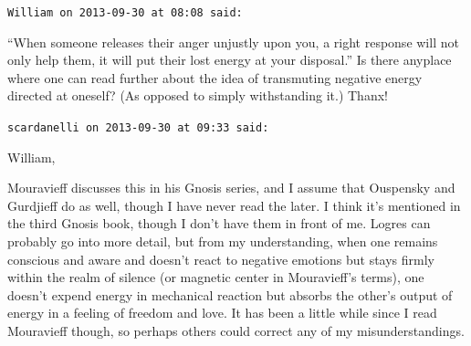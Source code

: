 \begin{footnotesize}
\begin{sffamily}
\texttt{William on 2013-09-30 at 08:08 said:}

``When someone releases their anger unjustly upon you, a right response will not only help them, it will put their lost energy at your disposal.'' Is there anyplace where one can read further about the idea of transmuting negative energy directed at oneself? (As opposed to simply withstanding it.) Thanx!

\hfill

\texttt{scardanelli on 2013-09-30 at 09:33 said:}

William,

Mouravieff discusses this in his Gnosis series, and I assume that Ouspensky and Gurdjieff do as well, though I have never read the later. I think it's mentioned in the third Gnosis book, though I don't have them in front of me. Logres can probably go into more detail, but from my understanding, when one remains conscious and aware and doesn't react to negative emotions but stays firmly within the realm of silence (or magnetic center in Mouravieff's terms), one doesn't expend energy in mechanical reaction but absorbs the other's output of energy in a feeling of freedom and love. It has been a little while since I read Mouravieff though, so perhaps others could correct any of my misunderstandings.


\hfill

\end{sffamily}
\end{footnotesize}

